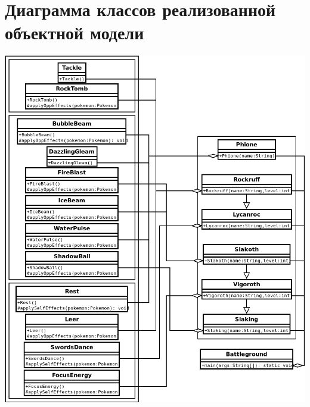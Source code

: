 \documentclass[11pt]{article}
\begin{document}
\section{Диаграмма классов реализованной объектной модели}
\label{sec:org2f84503}
\begin{center}
\includegraphics[width=.9\linewidth]{diagram.png}
\end{center}
\pagebreak{}
\end{document}

